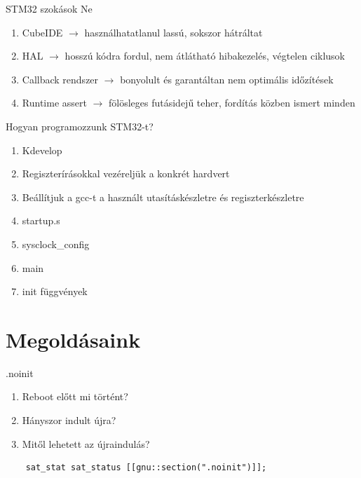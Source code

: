 \documentclass[aspectratio=169,xcolor=dvipsnames]{beamer}
\begin{document}
\begin{frame}{STM32 szokások}
	Ne
	\pause
	\begin{enumerate}
		\item CubeIDE $\rightarrow$ használhatatlanul lassú, sokszor hátráltat
		\pause
		\item HAL $\rightarrow$ hosszú kódra fordul, nem átlátható hibakezelés, végtelen ciklusok
		\pause
		\item Callback rendszer $\rightarrow$ bonyolult és garantáltan nem optimális időzítések
		\pause
		\item Runtime assert $\rightarrow$ fölösleges futásidejű teher, fordítás közben ismert minden
\end{enumerate}
\end{frame}

\begin{frame}{Hogyan programozzunk STM32-t?}
	\begin{enumerate}
		\item Kdevelop
		\item Regiszterírásokkal vezéreljük a konkrét hardvert
		\item Beállítjuk a gcc-t a használt utasításkészletre és regiszterkészletre \pause
		\item startup.s
		\item sysclock\_config
		\item main
		\item init függvények
	\end{enumerate}
\end{frame}

\section{Megoldásaink}

\begin{frame}[fragile]{.noinit}
	\begin{enumerate}
		\item Reboot előtt mi történt?
		\item Hányszor indult újra?
		\item Mitől lehetett az újraindulás?
	\end{enumerate}
	
	\begin{lstlisting}
	sat_stat sat_status [[gnu::section(".noinit")]];
	\end{lstlisting}
\end{frame}
\end{document}
